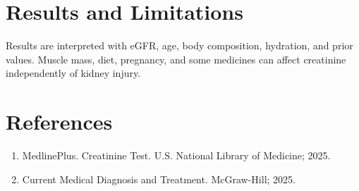 \section*{Results and Limitations}
Results are interpreted with eGFR, age, body composition, hydration, and prior values. Muscle mass, diet, pregnancy, and some medicines can affect creatinine independently of kidney injury.

\section*{References}
\begin{enumerate}
  \item MedlinePlus. Creatinine Test. U.S. National Library of Medicine; 2025.
  \item Current Medical Diagnosis and Treatment. McGraw-Hill; 2025.
\end{enumerate}
\clearpage
